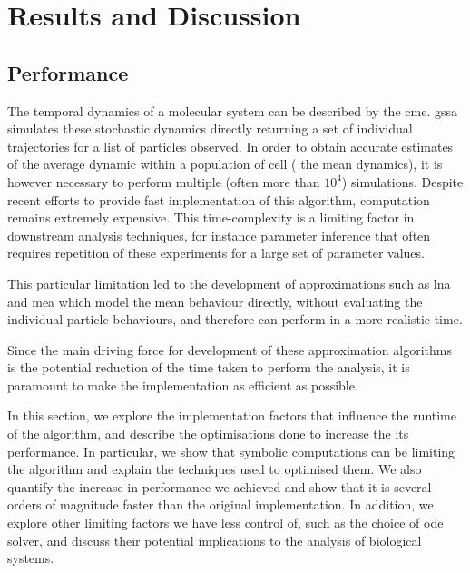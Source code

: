 \section{Results and Discussion} \label{results}



\subsection{Performance}\label{performance}
The temporal dynamics of a molecular system can be described by the \acrfull{cme}\cite{kampen_stochastic_2011}.
\acrfull{gssa}\cite{gillespie_general_1976} simulates these stochastic dynamics directly returning a set of individual trajectories for a list of particles observed.
In order to obtain accurate estimates of the average dynamic within a population of cell (\ie{} the mean dynamics), it is however necessary to perform multiple (often more than $10^4$) simulations.
Despite recent efforts \cite{niemi_efficient_2011,dittamo_optimized_2009,komarov_accelerating_2012} to provide fast implementation of this algorithm, computation remains extremely expensive. 
This time-complexity is a limiting factor in downstream analysis techniques, for
instance parameter inference that often requires repetition of these experiments for a large set of parameter values.

This particular limitation led to the development of approximations such as \acrfull{lna}\cite{komorowski_bayesian_2009} and \acrfull{mea}\cite{ale_general_2013}
 which model the mean behaviour directly, without evaluating the individual particle behaviours, and therefore can perform in a more realistic time.

Since the main driving force for development of these approximation algorithms is the potential reduction of the time taken to perform the analysis, 
it is paramount to make the implementation as efficient as possible.

In this section, we explore the implementation factors that influence the runtime of the algorithm, and describe the optimisations done to increase the its performance.
In particular, we show that symbolic computations can be limiting the algorithm and explain the techniques used to optimised them.
We also quantify the increase in performance we achieved and show that it is several orders of magnitude faster than the original \mat{} implementation.
In addition, we explore other limiting factors we have less control of, such as the choice of \gls{ode} solver, and discuss their potential implications to the analysis of biological systems.

